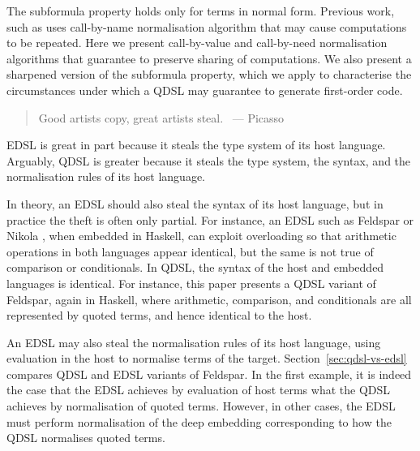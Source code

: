 \documentclass[authoryear,9pt]{sigplanconf}
\newcommand{\flushr}{{}\mbox{~}\hfill}%
\begin{document}
The subformula property holds only for terms in normal form.  Previous
work, such as \citep{cheney:linq} uses call-by-name normalisation
algorithm that may cause
computations to be repeated.  Here we present call-by-value and
call-by-need normalisation algorithms that guarantee to preserve
sharing of computations. We also present a sharpened version of
the subformula property, which we apply to characterise
the circumstances under which a QDSL may guarantee
to generate first-order code.

\vspace{2ex}
\begin{quote}
Good artists copy, great artists steal. \flushr --- Picasso
\end{quote}

EDSL is great in part because it steals the type system of its host
language. Arguably, QDSL is greater because it steals the type system,
the syntax, and the normalisation rules of its host language.

In theory, an EDSL should also steal the syntax of its host language,
but in practice the theft is often only partial.  For instance, an
EDSL such as Feldspar \citep{FELDSPAR} or Nikola \citep{NIKOLA},
when embedded in Haskell, can exploit
overloading so that arithmetic operations in both
languages appear identical, but the same is not true of comparison or
conditionals.
In QDSL, the syntax of the host and embedded languages
is identical. For instance, this paper presents a QDSL variant of
Feldspar, again in Haskell, where arithmetic, comparison, and
conditionals are all represented by quoted terms, and hence identical
to the host.

An EDSL may also steal the normalisation rules of its host language,
using evaluation in the host to normalise terms of the
target. Section~\ref{sec:qdsl-vs-edsl}
compares QDSL and EDSL variants of Feldspar. In the first example, it
is indeed the case that the EDSL achieves by evaluation of host terms
what the QDSL achieves by normalisation of quoted terms.  However, in
other cases, the EDSL must perform normalisation of the deep embedding
corresponding to how the QDSL normalises quoted terms.
\end{document}
